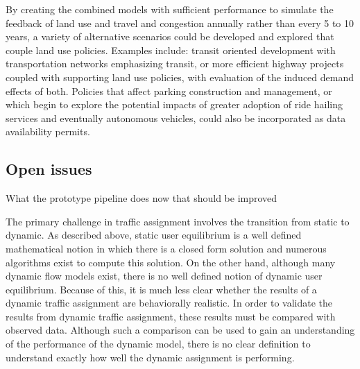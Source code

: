 By creating the combined models with sufficient performance to simulate the feedback of land use and travel and congestion annually rather than every 5 to 10 years, a variety of alternative scenarios could be developed and explored that couple land use policies. Examples include: transit oriented development with transportation networks emphasizing transit, or more efficient highway projects coupled with supporting land use policies, with evaluation of the induced demand effects of both. Policies that affect parking construction and management, or which begin to explore the potential impacts of greater adoption of ride hailing services and eventually autonomous vehicles, could also be incorporated as data availability permits.

\subsection{Open issues}

What the prototype pipeline does now that should be improved

The primary challenge in traffic assignment involves the transition from static to dynamic. As described above, static user equilibrium is a well defined mathematical notion in which there is a closed form solution and numerous algorithms exist to compute this solution. On the other hand, although many dynamic flow models exist, there is no well defined notion of dynamic user equilibrium. Because of this, it is much less clear whether the results of a dynamic traffic assignment are behaviorally realistic. In order to validate the results from dynamic traffic assignment, these results must be compared with observed data. Although such a comparison can be used to gain an understanding of the performance of the dynamic model, there is no clear definition to understand exactly how well the dynamic assignment is performing. 

